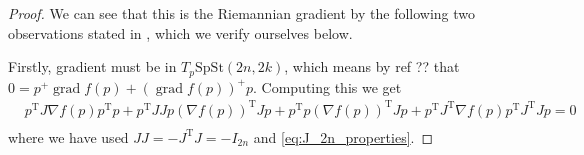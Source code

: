 \begin{proof}
    We can see that this is the Riemannian gradient by the following two observations stated in \cite{BZ}, which we verify ourselves below.

    Firstly, gradient must be in $T_{p}\mathrm{SpSt}(2n, 2k)$, which means by ref ?? that $0=p^{+}\operatorname{grad}f(p)+(\operatorname{grad}f(p))^{+}p$. Computing this we get 
    \begin{equation*}
        \begin{split}
        &p^{\mathrm{T}}J\nabla f(p)p^{\mathrm{T}}p+p^{\mathrm{T}}JJp(\nabla f(p))^{\mathrm{T}}Jp+p^{\mathrm{T}}p(\nabla f(p))^{\mathrm{T}}Jp+p^{\mathrm{T}}J^{\mathrm{T}}\nabla f(p)p^{\mathrm{T}}J^{\mathrm{T}}Jp=0\\
        \end{split}
    \end{equation*}
    where we have used $JJ=-J^{\mathrm{T}}J=-I_{2n}$ and \eqref{eq:J_2n_properties}.
    

\end{proof}
